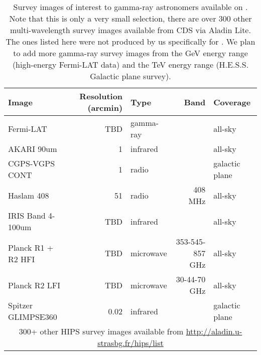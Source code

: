 
\begin{table}[tb]

\caption{
Survey images of interest to gamma-ray astronomers available on \gammasky . Note that this is only a very small selection, there are over 300 other multi-wavelength survey images available from CDS via Aladin Lite. The ones listed here were not produced by us specifically for \gammasky . We plan to add more gamma-ray survey images from the GeV energy range (high-energy Fermi-LAT data) and the TeV energy range (H.E.S.S. Galactic plane survey).
}
\label{tab:images}
\begin{tabular}{ lrlrl }
\hline
Image & Resolution (arcmin) & Type & Band & Coverage\\
\hline
Fermi-LAT & TBD & gamma-ray &  & all-sky\\
AKARI 90um & 1 & infrared &  & all-sky\\
CGPS-VGPS CONT & 1 & radio &  & galactic plane\\
Haslam 408 & 51 & radio & 408 MHz & all-sky\\
IRIS Band 4-100um & TBD & infrared &  & all-sky\\
Planck R1 + R2 HFI & TBD & microwave & 353-545-857 GHz & all-sky\\
Planck R2 LFI & TBD & microwave & 30-44-70 GHz & all-sky\\
Spitzer GLIMPSE360 & 0.02 & infrared &  & galactic plane\\
\multicolumn{5}{c}{300+ other HIPS survey images available from \url{http://aladin.u-strasbg.fr/hips/list}} \\
\hline
\end{tabular}

\end{table}
